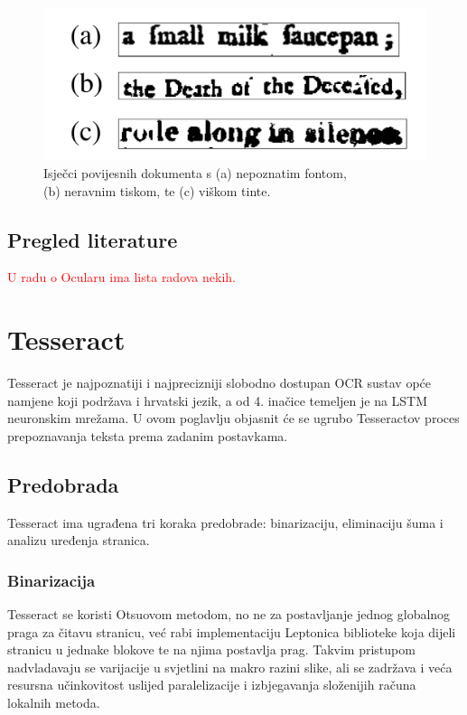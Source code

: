 \documentclass[zavrsnirad]{fer}
\begin{document}
\begin{figure}[hbt]
	\centering
	\includegraphics[width=0.6\linewidth]{Figures/historical-issues.png} 
	\caption{Isječci povijesnih dokumenta s (a) nepoznatim fontom, \\ (b) neravnim tiskom, te (c) viškom tinte. \cite{Berg2013}}
	\label{slk:historical-issues}
\end{figure}

\section{Pregled literature}

\textcolor{red}{U radu o Ocularu ima lista radova nekih.}

\cite{Berg2013}
\cite{Springmann2014}
\cite{Christy2017}
\cite{Wick2018}
\cite{Garrette2015}
\cite{Garrette2016}


\chapter{Tesseract}
\label{pog:tesseract}

Tesseract \cite{Smith2007} je najpoznatiji i najprecizniji slobodno dostupan OCR sustav opće namjene koji podržava i hrvatski jezik, a od 4. inačice temeljen je na LSTM neuronskim mrežama. U ovom poglavlju objasnit će se ugrubo Tesseractov proces prepoznavanja teksta prema zadanim postavkama.

\section{Predobrada}

Tesseract ima ugrađena tri koraka predobrade: binarizaciju, eliminaciju šuma i analizu uređenja stranica.

\subsection{Binarizacija}

Tesseract se koristi Otsuovom metodom, no ne za postavljanje jednog globalnog praga za čitavu stranicu, već rabi implementaciju Leptonica biblioteke \cite{Leptonica} koja dijeli stranicu u jednake blokove te na njima postavlja prag. Takvim pristupom nadvladavaju se varijacije u svjetlini na makro razini slike, ali se zadržava i veća resursna učinkovitost uslijed paralelizacije i izbjegavanja složenijih računa lokalnih metoda.
\end{document}

